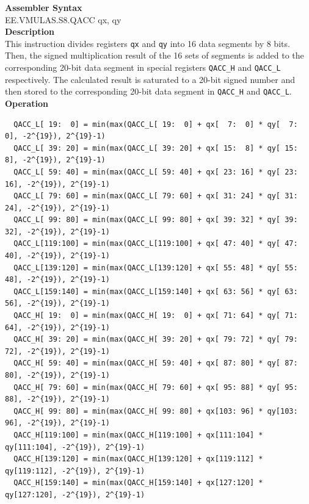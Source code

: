 \textbf{Assembler Syntax} \\
EE.VMULAS.S8.QACC qx, qy \\
\textbf{Description} \\
This instruction divides registers \lstinline{qx} and \lstinline{qy} into 16 data segments by 8 bits. Then, the signed multiplication result of the 16 sets of segments is added to the corresponding 20-bit data segment in special registers \lstinline{QACC_H} and \lstinline{QACC_L} respectively. The calculated result is saturated to a 20-bit signed number and then stored to the corresponding 20-bit data segment in \lstinline{QACC_H} and \lstinline{QACC_L}.\\
\textbf{Operation}
\begin{lstlisting}
  QACC_L[ 19:  0] = min(max(QACC_L[ 19:  0] + qx[  7:  0] * qy[  7:  0], -2^{19}), 2^{19}-1)
  QACC_L[ 39: 20] = min(max(QACC_L[ 39: 20] + qx[ 15:  8] * qy[ 15:  8], -2^{19}), 2^{19}-1)
  QACC_L[ 59: 40] = min(max(QACC_L[ 59: 40] + qx[ 23: 16] * qy[ 23: 16], -2^{19}), 2^{19}-1)
  QACC_L[ 79: 60] = min(max(QACC_L[ 79: 60] + qx[ 31: 24] * qy[ 31: 24], -2^{19}), 2^{19}-1)
  QACC_L[ 99: 80] = min(max(QACC_L[ 99: 80] + qx[ 39: 32] * qy[ 39: 32], -2^{19}), 2^{19}-1)
  QACC_L[119:100] = min(max(QACC_L[119:100] + qx[ 47: 40] * qy[ 47: 40], -2^{19}), 2^{19}-1)
  QACC_L[139:120] = min(max(QACC_L[139:120] + qx[ 55: 48] * qy[ 55: 48], -2^{19}), 2^{19}-1)
  QACC_L[159:140] = min(max(QACC_L[159:140] + qx[ 63: 56] * qy[ 63: 56], -2^{19}), 2^{19}-1)
  QACC_H[ 19:  0] = min(max(QACC_H[ 19:  0] + qx[ 71: 64] * qy[ 71: 64], -2^{19}), 2^{19}-1)
  QACC_H[ 39: 20] = min(max(QACC_H[ 39: 20] + qx[ 79: 72] * qy[ 79: 72], -2^{19}), 2^{19}-1)
  QACC_H[ 59: 40] = min(max(QACC_H[ 59: 40] + qx[ 87: 80] * qy[ 87: 80], -2^{19}), 2^{19}-1)
  QACC_H[ 79: 60] = min(max(QACC_H[ 79: 60] + qx[ 95: 88] * qy[ 95: 88], -2^{19}), 2^{19}-1)
  QACC_H[ 99: 80] = min(max(QACC_H[ 99: 80] + qx[103: 96] * qy[103: 96], -2^{19}), 2^{19}-1)
  QACC_H[119:100] = min(max(QACC_H[119:100] + qx[111:104] * qy[111:104], -2^{19}), 2^{19}-1)
  QACC_H[139:120] = min(max(QACC_H[139:120] + qx[119:112] * qy[119:112], -2^{19}), 2^{19}-1)
  QACC_H[159:140] = min(max(QACC_H[159:140] + qx[127:120] * qy[127:120], -2^{19}), 2^{19}-1)
\end{lstlisting}

\clearpage
